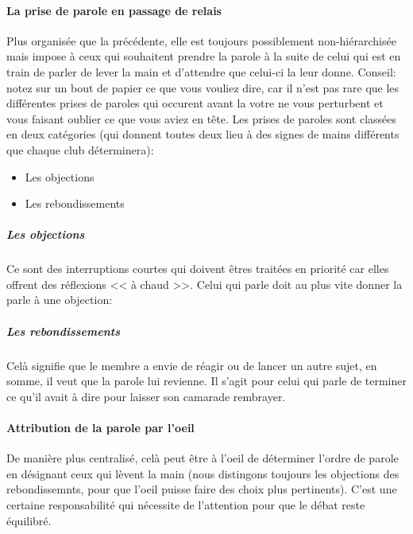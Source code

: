 \documentclass[a4paper,11pt]{article}
\begin{document}
\paragraph{La prise de parole en passage de relais}
Plus organisée que la précédente, elle est toujours possiblement non-hiérarchisée mais impose à ceux qui souhaitent prendre la parole à la suite de celui qui est en train de parler de lever la main et d'attendre que celui-ci la leur donne. Conseil: notez sur un bout de papier ce que vous vouliez dire, car il n'est pas rare que les différentes prises de paroles qui occurent avant la votre ne vous perturbent et vous faisant oublier ce que vous aviez en tête. Les prises de paroles sont classées en deux catégories (qui donnent toutes deux lieu à des signes de mains différents que chaque club déterminera):
\begin{itemize}
 \item Les objections
 \item Les rebondissements
\end{itemize}
\subparagraph{Les objections}
Ce sont des interruptions courtes qui doivent êtres traitées en priorité car elles offrent des réflexions << à chaud >>. Celui qui parle doit au plus vite donner la parle à une objection:
\subparagraph{Les rebondissements}
Celà signifie que le membre a envie de réagir ou de lancer un autre sujet, en somme, il veut que la parole lui revienne. Il s'agit pour celui qui parle de terminer ce qu'il avait à dire pour laisser son camarade rembrayer.
\paragraph{Attribution de la parole par l'oeil}
De manière plus centralisé, celà peut être à l'oeil de déterminer l'ordre de parole en désignant ceux qui lèvent la main (nous distingons toujours les objections des rebondissemnts, pour que l'oeil puisse faire des choix plus pertinents). C'est une certaine responsabilité qui nécessite de l'attention pour que le débat reste équilibré.
\end{document}
